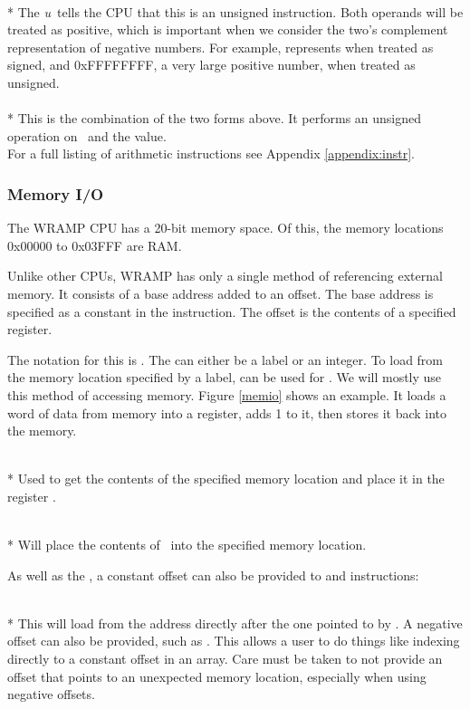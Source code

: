  \\* 
The \emph{u}\ tells the CPU that this is an unsigned instruction.
Both operands will be treated as positive, which is important when
we consider the two's complement representation of negative numbers.
For example, \mbox{} 
represents  when treated as signed, and 0xFFFFFFFF, a very 
large positive number, when treated as unsigned.
\\

 \\*
This is the combination of the two forms above. It performs an unsigned
operation on \regs\ and the  value.
\\

For a full listing of arithmetic instructions see Appendix
\ref{appendix:instr}.

\subsubsection{Memory I/O}
The WRAMP CPU has a 20-bit memory space. Of this, the memory locations 
0x00000 to 0x03FFF are RAM.

Unlike other CPUs, WRAMP has only a single method of referencing
external memory. It consists of a base address added to an offset.
The base address is specified as a constant in the instruction. The
offset is the contents of a specified register.

The notation for this is . The  can either
be a label or an integer. To load from the memory location specified
by a label,  can be used for \regs. We will mostly use this method
of accessing memory. Figure \ref{memio} shows an example.
It loads a word of data from memory into a register, adds 1 to it,
then stores it back into the memory.

\\*
Used to get the contents of the specified memory location and place it 
in the register \regd.

\\*
Will place the contents of \regd\ into the specified memory location.

As well as the , a constant offset can also be provided to
 and  instructions:

\\*
This will load from the address directly after the one pointed to by
. A negative offset can also be provided, such as .
This allows a user to do things like indexing directly to a constant
offset in an array. Care must be taken to not provide an offset that
points to an unexpected memory location, especially when using negative
offsets.

